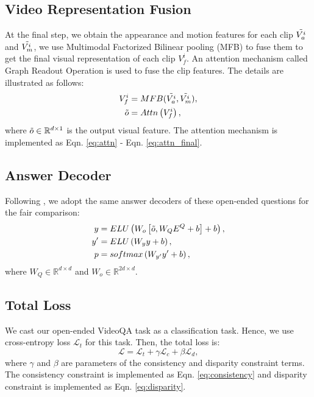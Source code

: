 \documentclass[journal]{IEEEtran}
\begin{document}
\subsection{Video Representation Fusion}
At the final step, we obtain the appearance and motion features for each clip $\Tilde{V^i_a}$ and $\Tilde{V^i_m}$, we use Multimodal Factorized Bilinear pooling (MFB) \cite{yu2017multi} to fuse them to get the final visual representation of each clip $V^i_f$. An attention mechanism called Graph Readout Operation \cite{wu2020comprehensive} is used to fuse the clip features. The details are illustrated as follows:
\begin{align}
    V^i_f & = MFB(\Tilde{V^i_a}, \Tilde{V^i_m}), \\
    \Tilde{o} & = Attn\left(V^i_f\right), 
\end{align}
where $\Tilde{o} \in \mathbb{R}^{d \times 1}$ is the output visual feature. The attention mechanism is implemented as Eqn. \eqref{eq:attn} - Eqn. \eqref{eq:attn_final}.

\subsection{Answer Decoder}
Following \cite{le2020hierarchical}, we adopt the same answer decoders of these open-ended questions for the fair comparison:
\begin{align}
    y & = ELU\left(W_o\left[\Tilde{o},W_QE^Q+b\right]+b\right), \\
    y' & = ELU\left(W_yy+b\right), \\
    p & = softmax\left(W_{y'}y'+b\right), \label{eq:prob}
\end{align}
where $W_Q \in \mathbb{R}^{d \times d}$ and $W_o \in \mathbb{R}^{2d \times d}$.
\subsection{Total Loss}\label{sec:Loss}
We cast our open-ended VideoQA task as a classification task. Hence, we use cross-entropy loss $\mathcal{L}_t$ for this task. Then, the total loss is:
\begin{equation}
    \mathcal{L} = \mathcal{L}_t + \gamma \mathcal{L}_c + \beta \mathcal{L}_d,
\end{equation}
where $\gamma$ and $\beta$ are parameters of the consistency and disparity constraint terms. The consistency constraint is implemented as Eqn. \eqref{eq:consistency} and disparity constraint is implemented as Eqn. \eqref{eq:disparity}.
\end{document}
